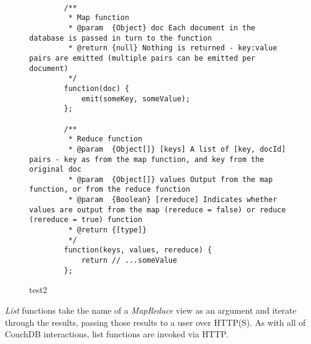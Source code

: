 \begin{figure}[h]
    \centering
    \begin{verbatim} 

        /**
         * Map function
         * @param  {Object} doc Each document in the database is passed in turn to the function
         * @return {null} Nothing is returned - key:value pairs are emitted (multiple pairs can be emitted per document)
         */
        function(doc) {
            emit(someKey, someValue);
        };

        /**
         * Reduce function
         * @param  {Object[]} [keys] A list of [key, docId] pairs - key as from the map function, and key from the original doc
         * @param  {Object[]} values Output from the map function, or from the reduce function
         * @param  {Boolean} [rereduce] Indicates whether values are output from the map (rereduce = false) or reduce (rereduce = true) function
         * @return {[type]}
         */
        function(keys, values, rereduce) {
            return // ...someValue
        };
    \end{verbatim}
    \caption[test1]{test2}
    \label{couchmapreduce}
\end{figure}

\textit{List} functions take the name of a \textit{MapReduce} view as an argument and iterate through the results, passing those results to a user over HTTP(S). As with all of CouchDB interactions, list functions are invoked via HTTP.